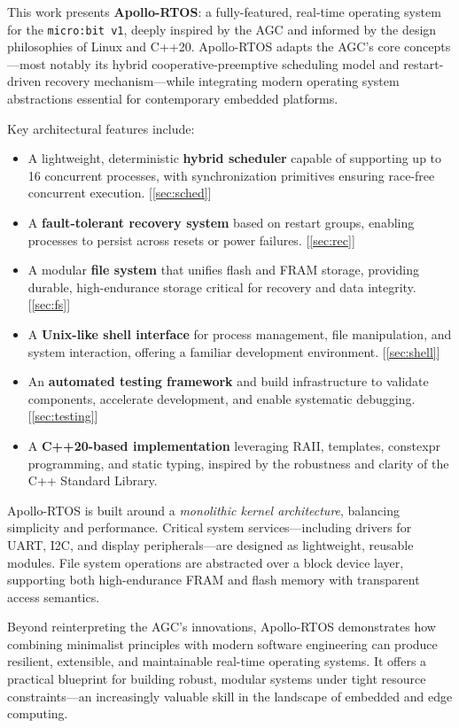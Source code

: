 This work presents \textbf{Apollo-RTOS}: a fully-featured, real-time operating system
for the \texttt{micro:bit v1}, deeply inspired by the AGC and informed by the design
philosophies of Linux and C++20. Apollo-RTOS adapts the AGC’s core concepts—most
notably its hybrid cooperative-preemptive scheduling model and restart-driven recovery
mechanism—while integrating modern operating system abstractions essential for
contemporary embedded platforms.

Key architectural features include: 
\begin{itemize}[left=10pt] 
    \item A lightweight, deterministic \textbf{hybrid scheduler} capable of supporting
        up to 16 concurrent processes, with synchronization primitives ensuring
        race-free concurrent execution. [\autoref{sec:sched}] 
    \item A \textbf{fault-tolerant recovery system} based on restart groups, enabling
        processes to persist across resets or power failures. [\autoref{sec:rec}] 
    \item A modular \textbf{file system} that unifies flash and FRAM storage, providing
        durable, high-endurance storage critical for recovery and data integrity.
        [\autoref{sec:fs}] 
    \item A \textbf{Unix-like shell interface} for process management, file
        manipulation, and system interaction, offering a familiar development
        environment. [\autoref{sec:shell}] 
    \item An \textbf{automated testing framework} and build infrastructure to validate
        components, accelerate development, and enable systematic debugging.
        [\autoref{sec:testing}] 
    \item A \textbf{C++20-based implementation} leveraging RAII, templates, constexpr
        programming, and static typing, inspired by the robustness and clarity of the
        C++ Standard Library. 
\end{itemize}

Apollo-RTOS is built around a \textit{monolithic kernel architecture}, balancing
simplicity and performance. Critical system services—including drivers for UART, I2C,
and display peripherals—are designed as lightweight, reusable modules. File system
operations are abstracted over a block device layer, supporting both high-endurance
FRAM and flash memory with transparent access semantics.

Beyond reinterpreting the AGC’s innovations, Apollo-RTOS demonstrates how combining
minimalist principles with modern software engineering can produce resilient,
extensible, and maintainable real-time operating systems. It offers a practical
blueprint for building robust, modular systems under tight resource constraints—an
increasingly valuable skill in the landscape of embedded and edge computing.

